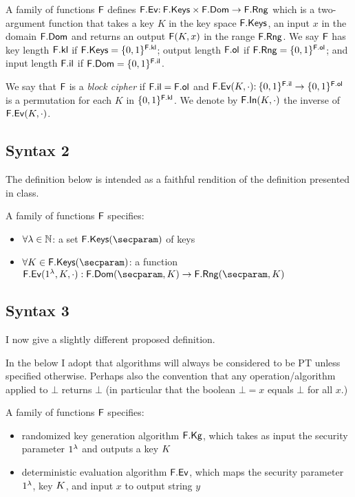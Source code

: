 
A family of functions $\mathsf{F}$ defines $\mathsf{F}.\mathsf{Ev} {:\:} \mathsf{F}.\mathsf{Keys} \times \mathsf{F}.\mathsf{Dom}\to \mathsf{F}.\mathsf{Rng}$ which is a two-argument function that takes a key $K$ in the key space $\mathsf{F}.\mathsf{Keys}$, an input $x$ in the domain $\mathsf{F}.\mathsf{Dom}$ and returns an output $\mathsf{F}(K,x)$ in the range $\mathsf{F}.\mathsf{Rng}$. We say $\mathsf{F}$ has key length $\mathsf{F}.\mathsf{kl}$ if
$\mathsf{F}.\mathsf{Keys}=\{0,1\}^{\mathsf{F}.\mathsf{kl}}$; output length $\mathsf{F}.\mathsf{ol}$ if $\mathsf{F}.\mathsf{Rng}=\{0,1\}^{\mathsf{F}.\mathsf{ol}}$; and input length $\mathsf{F}.\mathsf{il}$ if $\mathsf{F}.\mathsf{Dom}=\{0,1\}^{\mathsf{F}.\mathsf{il}}$.

We say that $\mathsf{F}$ is a \emph{block cipher} if $\mathsf{F}.\mathsf{il}=\mathsf{F}.\mathsf{ol}$ and $\mathsf{F}.\mathsf{Ev}(K,\cdot) {:\:} \{0,1\}^{\mathsf{F}.\mathsf{il}}\to\{0,1\}^{\mathsf{F}.\mathsf{ol}}$ is a permutation for each $K$ in $\{0,1\}^{\mathsf{F}.\mathsf{kl}}$. We denote by $\mathsf{F}.\mathsf{In}(K,\cdot)$ the inverse of $\mathsf{F}.\mathsf{Ev}(K,\cdot)$.

\subsection{Syntax 2}

The definition below is intended as a faithful rendition of the definition presented in class.

\begin{defn}
	A family of functions $\mathsf{F}$ specifies:
	\begin{itemize}
		\item $\forall \lambda\in{{\mathbb N}}$: a set $\Keys{\FF}(\secparam)$ of keys
		\item $\forall \key\in\Keys{\FF}(\secparam)$: a function $\Ev{\FF}(\secIn,\key,\cdot):\Dom{\FF}(\secparam,\key)\to\Rng{\FF}(\secparam,\key)$
	\end{itemize}
\end{defn}

\subsection{Syntax 3}

I now give a slightly different proposed definition.

In the below I adopt that algorithms will always be considered to be PT unless specified otherwise.
Perhaps also the convention that any operation/algorithm applied to $\bot$ returns $\bot$ (in particular that the boolean $\bot=x$ equals $\bot$ for all $x$.)

\begin{defn}
	A family of functions $\mathsf{F}$ specifies:
	\begin{itemize}
		\item randomized key generation algorithm $\mathsf{F}.\mathsf{Kg}$, which takes as input the security parameter $1^\lambda$ and outputs a key $K$
		\item deterministic evaluation algorithm $\mathsf{F}.\mathsf{Ev}$,  which maps the security parameter $1^\lambda$,  key $K$, and input $x$ to output string $y$ 
	\end{itemize}
\end{defn}

